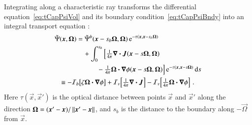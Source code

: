 \documentclass{anstrans}
\begin{document}
Integrating along a characteristic ray transforms the differential
equation~\eqref{eq:tCapPsiVol} and its boundary condition~\eqref{eq:tCapPsiBndy}
into an integral transport equation
\cite{Pri2010}:
\begin{subequations} \label{eqs:inverseTransport}
\begin{align} \label{eq:inverseTransportFull}
\begin{split}
  \tilde\Psi(\bm{x}, \bm{\Omega})
  &=
  \tilde\Psi^b(\bm{x} - s_b\bm{\Omega}, \bm{\Omega})
  \mathop{}\!\mathrm{e}^{ -\tau(\bm{x}, \bm{x} - s_b \bm{\Omega})}
  \\
  &\quad +  \int_{0}^{s_b}
  \Big[\tfrac{1}{4\pi} \bm{\nabla} \bm{\cdot}\bm{J}(\bm{x} - s \bm{\Omega}, \bm{\Omega})
  \\
  &\quad\qquad - \tfrac{1}{4\pi} \bm{\Omega}\bm{\cdot} \bm{\nabla} \phi(\bm{x} - s
  \bm{\Omega}, \bm{\Omega}) \Big]
  \mathop{}\!\mathrm{e}^{ -\tau(\bm{x}, \bm{x} - s \bm{\Omega})} \mathop{}\!\mathrm{d} s
\end{split}
\\ \label{eq:inverseTransportBrief}
\begin{split}
    &\equiv
    -\mathcal{I}_{b}\!\left[\zeta \bm{\Omega}\bm{\cdot} \bm{\nabla} \phi\right]
    + \mathcal{I}_{v}\!\left[\tfrac{1}{4\pi} \bm{\nabla} \bm{\cdot}\bm{J} \right]
    - \mathcal{I}_{v}\!\left[\tfrac{1}{4\pi} \bm{\Omega}\bm{\cdot} \bm{\nabla} \phi\right]\,.
\end{split}
\end{align}
\end{subequations}
Here $\tau(\vec{x}, \vec{x}')$ is the optical distance between
points
$\vec{x}$ and $\vec{x}'$
along the direction $\bm{\Omega} = (\bm{x}'-
\bm{x})/\left\| \bm{x}'-\bm{x} \right\|$,
and $s_b$ is the distance to the boundary along $-\vec{\Omega}$ from
$\vec{x}$.
\end{document}
